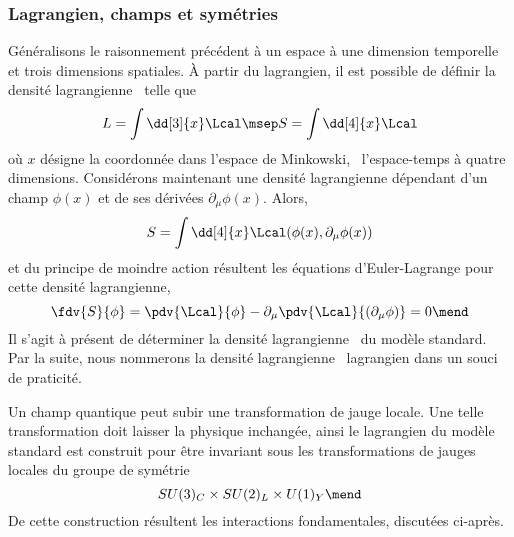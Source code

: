 \subsubsection{Lagrangien, champs et symétries}\label{chapter-MS-MSSM-section-formalisme-subsec-into_lagrangien-subsubsec-lagrangien_champs_symetries}
Généralisons le raisonnement précédent à un espace à une dimension temporelle et trois dimensions spatiales.
À partir du lagrangien, il est possible de définir la densité lagrangienne \Lcal\ telle que
\begin{equation}
L = \int\dd[3]{x}\Lcal
\msep
S = \int\dd[4]{x}\Lcal
\end{equation}
où $x$ désigne la coordonnée dans l'espace de Minkowski, \ie\ l'espace-temps à quatre dimensions.
Considérons maintenant une densité lagrangienne dépendant d'un champ $\phi(x)$ et de ses dérivées $\partial_\mu\phi(x)$.
Alors,
\begin{equation}
S = \int\dd[4]{x}\Lcal(\phi(x),\partial_\mu\phi(x))
\end{equation}
et du principe de moindre action résultent les équations d'Euler-Lagrange pour cette densité lagrangienne,
\begin{equation}
\fdv{S}{\phi}
=
\pdv{\Lcal}{\phi} - \partial_\mu\pdv{\Lcal}{(\partial_\mu\phi)} = 0
\mend
\end{equation}
Il s'agit à présent de déterminer la densité lagrangienne \Lcal\ du modèle standard.
Par la suite, nous nommerons la densité lagrangienne \Lcal\ \og lagrangien \fg{} dans un souci de praticité.
\par Un champ quantique peut subir une transformation de jauge locale. Une telle transformation doit laisser la physique inchangée, ainsi le lagrangien du modèle standard est construit pour être invariant sous les transformations de jauges locales du groupe de symétrie
\begin{equation}
SU(3)_C \times SU(2)_L \times U(1)_Y
\mend
\label{eq-symmetries_lagrangien_SM}
\end{equation}
De cette construction résultent les interactions fondamentales, discutées ci-après.






